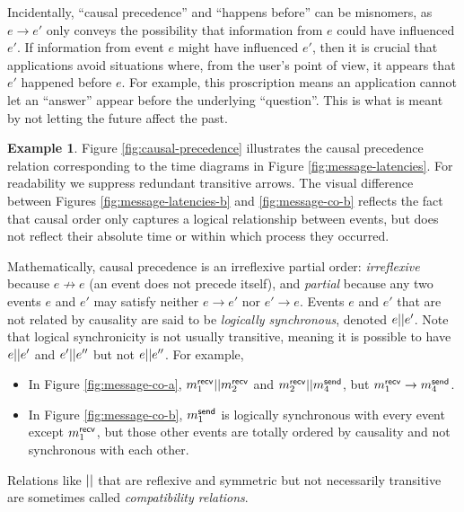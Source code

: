 \documentclass[]             %
{NASA}                       %
\theoremstyle{definition}
\newtheorem{example}[theorem]{Example}
\begin{document}
Incidentally, ``causal precedence'' and ``happens before'' can be
misnomers, as $e \to e'$ only conveys the possibility that information
from $e$ could have influenced $e'$. If information from event $e$
might have influenced $e'$, then it is crucial that applications avoid
situations where, from the user's point of view, it appears that $e'$
happened before $e$. For example, this proscription means an
application cannot let an ``answer'' appear before the underlying
``question''. This is what is meant by not letting the future affect
the past.

\begin{example}
  Figure \ref{fig:causal-precedence} illustrates the causal precedence
  relation corresponding to the time diagrams in Figure
  \ref{fig:message-latencies}. For readability we suppress redundant
  transitive arrows. The visual difference between Figures
  \ref{fig:message-latencies-b} and \ref{fig:message-co-b} reflects
  the fact that causal order only captures a logical relationship
  between events, but does not reflect their absolute time or within
  which process they occurred.
\end{example}

Mathematically, causal precedence is an irreflexive partial order:
\emph{irreflexive} because $e \not \to e$ (an event does not precede
itself), and \emph{partial} because any two events $e$ and $e'$ may
satisfy neither $e \to e'$ nor $e' \to e$. Events $e$ and $e'$ that
are not related by causality are said to be \emph{logically
  synchronous}, denoted $e || e'$. Note that logical
synchronicity is not usually transitive, meaning it is possible to
have $e || e'$ and $e' || e''$ but not $e || e''$. For
example,
\begin{itemize}
\item In Figure \ref{fig:message-co-a}, $m_{1}^{\mathsf{recv}} || m_{2}^{\mathsf{recv}}$
  and $m_{2}^{\mathsf{recv}} || m_{4}^{\mathsf{send}}$, but $m_{1}^{\mathsf{recv}} \to m_{4}^{\mathsf{send}}$.
\item In Figure \ref{fig:message-co-b}, $m_{1}^{\mathsf{send}}$ is logically synchronous
with every event except $m_{1}^{\mathsf{recv}}$, but those other events are
totally ordered by causality and not synchronous with each
other.
\end{itemize}
Relations like $||$ that are reflexive and symmetric but not
necessarily transitive are sometimes called \emph{compatibility
  relations}.
\end{document}
